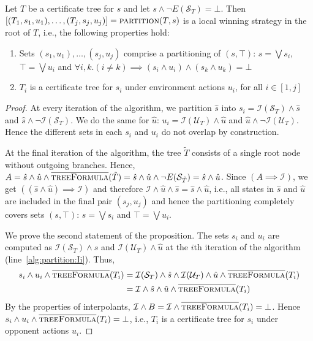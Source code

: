 \begin{proposition}\label{prop:partition}
    Let $T$ be a certificate tree for $s$ and let $s \land \lnot E(\mathcal{S}_T) = \bot$. Then $[(T_1, s_1, u_1),\ldots,(T_j, s_j, u_j)] = \textsc{partition}(T, s)$ is a local winning strategy in the root of $T$, i.e., the following properties hold:
    \begin{enumerate}
        \item Sets $(s_1,u_1) ,\ldots, (s_j,u_j)$ comprise a partitioning of
            $(s, \top)$: $s = \bigvee s_i$, $\top = \bigvee u_i$ and $\forall i, k. (i\neq k) \implies (s_i \land u_i) \land (s_k \land u_k) = \bot$
        \item $T_i$ is a certificate tree for $s_i$ under environment actions $u_i$, for all $i\in[1,j]$
    \end{enumerate}
\end{proposition}
\begin{proof}
    At every iteration of the algorithm, we partition $\hat{s}$ into $s_i = \mathcal{I}(\mathcal{S}_T) \land \hat{s}$ and $\hat{s} \land \neg\mathcal{I}(\mathcal{S}_T)$. We do the same for $\hat{u}$: $u_i = \mathcal{I}(\mathcal{U}_T) \land \hat{u}$ and $\hat{u} \land \neg\mathcal{I}(\mathcal{U}_T)$. Hence the different sets in each $s_i$ and $u_i$ do not overlap by construction.

    At the final iteration of the algorithm, the tree $\tilde{T}$ consists of a single root node without outgoing branches.  Hence, $A = \hat{s} \land \hat{u} \land \textsc{$\overline{\mbox{treeFormula}}$}(\tilde{T}) = \hat{s} \land \hat{u} \land \neg E(\mathcal{S}_{\tilde{T}}) = \hat{s} \land \hat{u}$.  Since $(A \implies \mathcal{I})$, we get $((\hat{s} \land \hat{u}) \implies \mathcal{I})$ and therefore $\mathcal{I} \land \hat{u} \land \hat{s} = \hat{s} \land \hat{u}$, i.e., all states in $\hat{s}$ and $\hat{u}$ are included in the final pair $(s_j, u_j)$ and hence the partitioning completely covers sets $(s, \top)$: $s=\bigvee s_i$ and $\top = \bigvee u_i$.

    We prove the second statement of the proposition.  The sets $s_i$ and $u_i$ are computed as
    $\mathcal{I}(\mathcal{S}_T) \land \hat{s}$ and $\mathcal{I}(\mathcal{U}_T) \land \hat{u}$ at the $i$th iteration of the algorithm (line~\ref{alg:partition:Ii}).
    Thus, 
    \begin{align*}
        s_i \land u_i \land \textsc{$\overline{\mbox{treeFormula}}$}(T_i) ={}& \mathcal{I}(\mathcal{S}_T) \land \hat{s} \land \mathcal{I}(\mathcal{U}_T) \land \hat{u} \land \textsc{$\overline{\mbox{treeFormula}}$}(T_i) \\
        ={}& \mathcal{I} \land \hat{s} \land \hat{u} \land \textsc{$\overline{\mbox{treeFormula}}$}(T_i)
    \end{align*}
    By the properties of interpolants, $\mathcal{I} \land B = \mathcal{I} \land \textsc{$\overline{\mbox{treeFormula}}$}(T_i) = \bot$.
    Hence $s_i \land u_i \land \textsc{$\overline{\mbox{treeFormula}}$}(T_i) = \bot$, i.e., $T_i$ is a certificate tree for $s_i$ under opponent actions $u_i$.
\end{proof}

